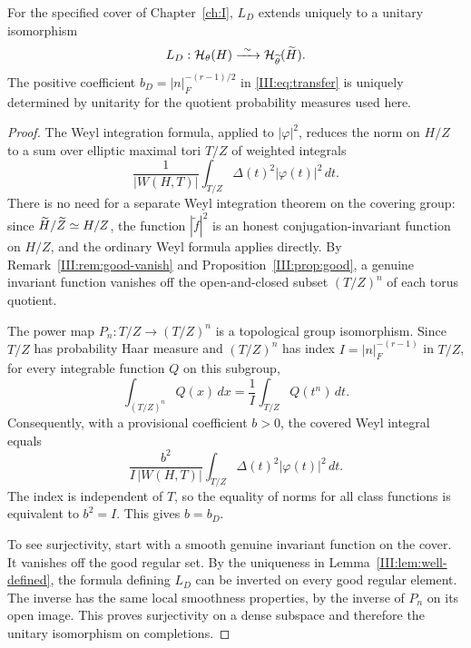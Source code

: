 \begin{theorem}\label{III:thm:unitary}
For the specified cover of Chapter~\ref{ch:I}, $L_D$ extends uniquely to a unitary isomorphism
\begin{equation}\label{III:eq:unitary}
L_D:\mathcal H_\theta(H)\xrightarrow{\ \sim\ }\mathcal H_{\widetilde\theta}(\widetilde H).
\end{equation}
The positive coefficient $b_D=|n|_F^{-(r-1)/2}$ in \eqref{III:eq:transfer} is uniquely determined by unitarity for the quotient probability measures used here.
\end{theorem}
\begin{proof}
The Weyl integration formula, applied to $|\varphi|^2$, reduces the norm on $H/Z$ to a sum over elliptic maximal tori $T/Z$ of weighted integrals
\[
\frac{1}{|W(H,T)|}\int_{T/Z}\Delta(t)^2|\varphi(t)|^2\,dt.
\]
There is no need for a separate Weyl integration theorem on the covering group: since $\widetilde H/\widetilde Z\simeq H/Z$, the function $|\widetilde f|^2$ is an honest conjugation-invariant function on $H/Z$, and the ordinary Weyl formula applies directly. By Remark~\ref{III:rem:good-vanish} and Proposition~\ref{III:prop:good}, a genuine invariant function vanishes off the open-and-closed subset $(T/Z)^n$ of each torus quotient.

The power map $P_n:T/Z\to(T/Z)^n$ is a topological group isomorphism. Since $T/Z$ has probability Haar measure and $(T/Z)^n$ has index $I=|n|_F^{-(r-1)}$ in $T/Z$, for every integrable function $Q$ on this subgroup,
\begin{equation}\label{III:eq:changevar}
\int_{(T/Z)^n}Q(x)\,dx=\frac1I\int_{T/Z}Q(t^n)\,dt.
\end{equation}
Consequently, with a provisional coefficient $b>0$, the covered Weyl integral equals
\[
\frac{b^2}{I\,|W(H,T)|}\int_{T/Z}\Delta(t)^2|\varphi(t)|^2\,dt.
\]
The index is independent of $T$, so the equality of norms for all class functions is equivalent to $b^2=I$. This gives $b=b_D$.

To see surjectivity, start with a smooth genuine invariant function on the cover. It vanishes off the good regular set. By the uniqueness in Lemma~\ref{III:lem:well-defined}, the formula defining $L_D$ can be inverted on every good regular element. The inverse has the same local smoothness properties, by the inverse of $P_n$ on its open image. This proves surjectivity on a dense subspace and therefore the unitary isomorphism on completions.
\end{proof}

